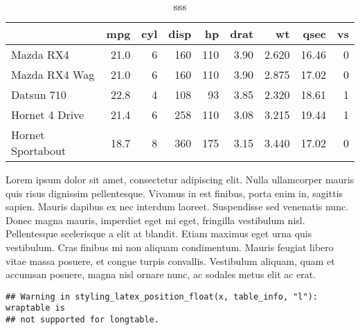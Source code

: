 \documentclass[]{article}
\newenvironment{Shaded}{\begin{snugshade}}{\end{snugshade}}
\newcommand{\KeywordTok}[1]{\textcolor[rgb]{0.13,0.29,0.53}{\textbf{{#1}}}}
\newcommand{\DataTypeTok}[1]{\textcolor[rgb]{0.13,0.29,0.53}{{#1}}}
\newcommand{\DecValTok}[1]{\textcolor[rgb]{0.00,0.00,0.81}{{#1}}}
\newcommand{\StringTok}[1]{\textcolor[rgb]{0.31,0.60,0.02}{{#1}}}
\newcommand{\NormalTok}[1]{{#1}}
\begin{document}
\begingroup\fontsize{6}{8}\selectfont
{}

\begin{longtable}[l]{lrrrrrrrr}
\caption{\label{tab:unnamed-chunk-7}sss}\\
\toprule
  & mpg & cyl & disp & hp & drat & wt & qsec & vs\\
\midrule
Mazda RX4 & 21.0 & 6 & 160 & 110 & 3.90 & 2.620 & 16.46 & 0\\
Mazda RX4 Wag & 21.0 & 6 & 160 & 110 & 3.90 & 2.875 & 17.02 & 0\\
Datsun 710 & 22.8 & 4 & 108 & 93 & 3.85 & 2.320 & 18.61 & 1\\
Hornet 4 Drive & 21.4 & 6 & 258 & 110 & 3.08 & 3.215 & 19.44 & 1\\
Hornet Sportabout & 18.7 & 8 & 360 & 175 & 3.15 & 3.440 & 17.02 & 0\\
\bottomrule
\end{longtable}

\endgroup

Lorem ipsum dolor sit amet, consectetur adipiscing elit. Nulla
ullamcorper mauris quis risus dignissim pellentesque. Vivamus in est
finibus, porta enim in, sagittis sapien. Mauris dapibus ex nec interdum
laoreet. Suspendisse sed venenatis nunc. Donec magna mauris, imperdiet
eget mi eget, fringilla vestibulum nisl. Pellentesque scelerisque a elit
at blandit. Etiam maximus eget urna quis vestibulum. Cras finibus mi non
aliquam condimentum. Mauris feugiat libero vitae massa posuere, et
congue turpis convallis. Vestibulum aliquam, quam et accumsan posuere,
magna nisl ornare nunc, ac sodales metus elit ac erat.

\begin{Shaded}
\end{Shaded}

\begin{verbatim}
## Warning in styling_latex_position_float(x, table_info, "l"): wraptable is
## not supported for longtable.
\end{verbatim}
\end{document}
